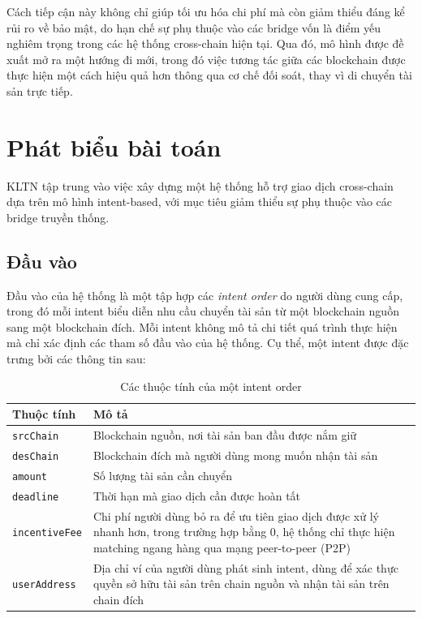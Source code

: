 Cách tiếp cận này không chỉ giúp tối ưu hóa chi phí mà còn giảm thiểu đáng kể rủi ro về bảo mật, do hạn chế sự phụ thuộc vào các bridge vốn là điểm yếu nghiêm trọng trong các hệ thống cross-chain hiện tại. 
Qua đó, mô hình được đề xuất mở ra một hướng đi mới, trong đó việc tương tác giữa các blockchain được thực hiện một cách hiệu quả hơn thông qua cơ chế đối soát, thay vì di chuyển tài sản trực tiếp.

\section{Phát biểu bài toán}

KLTN tập trung vào việc xây dựng một hệ thống hỗ trợ giao dịch cross-chain dựa trên mô hình intent-based, với mục tiêu giảm thiểu sự phụ thuộc vào các bridge truyền thống.

\subsection{Đầu vào}

Đầu vào của hệ thống là một tập hợp các \textit{intent order} do người dùng cung cấp, trong đó mỗi intent biểu diễn nhu cầu chuyển tài sản từ một blockchain nguồn sang một blockchain đích. 
Mỗi intent không mô tả chi tiết quá trình thực hiện mà chỉ xác định các tham số đầu vào của hệ thống. Cụ thể, một intent được đặc trưng bởi các thông tin sau:

\begin{table}[H]
    \centering
    \caption{Các thuộc tính của một intent order}
    \label{tab:intent-attributes}
    \begin{tabular}{|l|p{10cm}|}
        \hline
        \textbf{Thuộc tính} & \textbf{Mô tả} \\
        \hline
        \texttt{srcChain} & Blockchain nguồn, nơi tài sản ban đầu được nắm giữ \\
        \hline
        \texttt{desChain} & Blockchain đích mà người dùng mong muốn nhận tài sản \\
        \hline
        \texttt{amount} & Số lượng tài sản cần chuyển \\
        \hline
        \texttt{deadline} & Thời hạn mà giao dịch cần được hoàn tất \\
        \hline
        \texttt{incentiveFee} & Chi phí người dùng bỏ ra để ưu tiên giao dịch được xử lý nhanh hơn, trong trường hợp bằng 0, hệ thống chỉ thực hiện matching ngang hàng qua mạng peer-to-peer (P2P) \\
        \hline
        \texttt{userAddress} & Địa chỉ ví của người dùng phát sinh intent, dùng để xác thực quyền sở hữu tài sản trên chain nguồn và nhận tài sản trên chain đích \\
        \hline
    \end{tabular}
\end{table}

